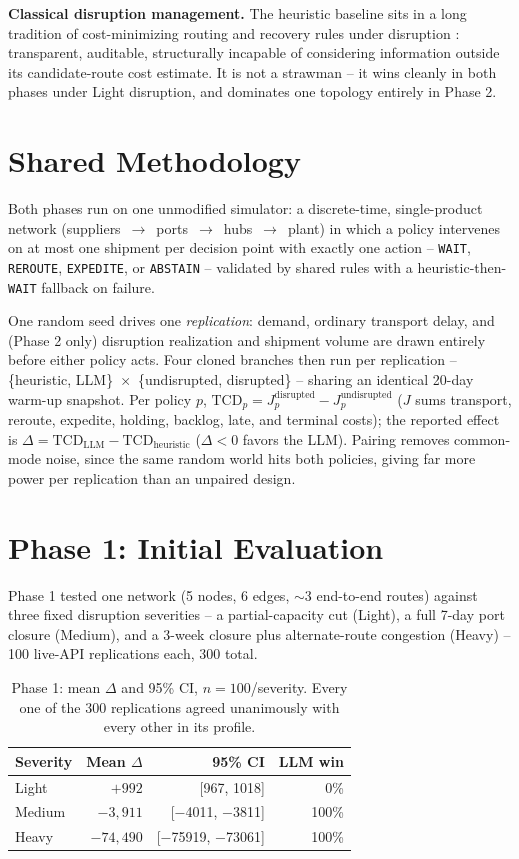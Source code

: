 \documentclass[10pt,twocolumn]{article}
\newcommand{\tcd}{\ensuremath{\mathrm{TCD}}}
\begin{document}
\textbf{Classical disruption management.} The heuristic baseline sits in a long tradition of cost-minimizing routing and recovery rules under disruption \cite{sheffi2005resilient,christopher2004building}: transparent, auditable, structurally incapable of considering information outside its candidate-route cost estimate. It is not a strawman -- it wins cleanly in both phases under Light disruption, and dominates one topology entirely in Phase 2.

\section{Shared Methodology}
\label{sec:method}
Both phases run on one unmodified simulator: a discrete-time, single-product network (suppliers~$\to$~ports~$\to$~hubs~$\to$~plant) in which a policy intervenes on at most one shipment per decision point with exactly one action -- \texttt{WAIT}, \texttt{REROUTE}, \texttt{EXPEDITE}, or \texttt{ABSTAIN} -- validated by shared rules with a heuristic-then-\texttt{WAIT} fallback on failure.

One random seed drives one \emph{replication}: demand, ordinary transport delay, and (Phase 2 only) disruption realization and shipment volume are drawn entirely before either policy acts. Four cloned branches then run per replication -- \{heuristic, LLM\}~$\times$~\{undisrupted, disrupted\} -- sharing an identical 20-day warm-up snapshot. Per policy $p$, $\tcd_p = J^{\text{disrupted}}_p - J^{\text{undisrupted}}_p$ ($J$ sums transport, reroute, expedite, holding, backlog, late, and terminal costs); the reported effect is $\Delta = \tcd_{\text{LLM}} - \tcd_{\text{heuristic}}$ ($\Delta<0$ favors the LLM). Pairing removes common-mode noise, since the same random world hits both policies, giving far more power per replication than an unpaired design.

\section{Phase 1: Initial Evaluation}
\label{sec:phase1}
Phase 1 tested one network (5 nodes, 6 edges, $\sim$3 end-to-end routes) against three fixed disruption severities -- a partial-capacity cut (Light), a full 7-day port closure (Medium), and a 3-week closure plus alternate-route congestion (Heavy) -- 100 live-API replications each, 300 total.

\begin{table}[t]
\centering
\small
\begin{tabular}{@{}lrrr@{}}
\toprule
Severity & Mean $\Delta$ & 95\% CI & LLM win \\
\midrule
Light  & $+992$ & [967, 1018] & 0\% \\
Medium & $-3{,}911$ & [$-$4011, $-$3811] & 100\% \\
Heavy  & $-74{,}490$ & [$-$75919, $-$73061] & 100\% \\
\bottomrule
\end{tabular}
\caption{Phase 1: mean $\Delta$ and 95\% CI, $n=100$/severity. Every one of the 300 replications agreed unanimously with every other in its profile.}
\label{tab:v1}
\end{table}
\end{document}
